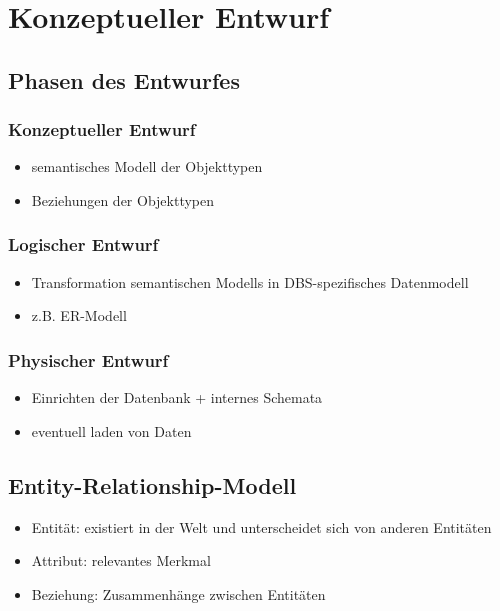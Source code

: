 \documentclass[a4paper]{article}
\begin{document}
\section{Konzeptueller Entwurf}

\subsection{Phasen des Entwurfes}
\subsubsection{Konzeptueller Entwurf}
\begin{itemize}
    \item semantisches Modell der Objekttypen
    \item Beziehungen der Objekttypen
\end{itemize}

\subsubsection{Logischer Entwurf}
\begin{itemize}
    \item Transformation semantischen Modells in DBS-spezifisches Datenmodell
    \item z.B. ER-Modell
\end{itemize}

\subsubsection{Physischer Entwurf}
\begin{itemize}
    \item Einrichten der Datenbank + internes Schemata
    \item eventuell laden von Daten
\end{itemize}

\subsection{Entity-Relationship-Modell}
\begin{itemize}
    \item Entität: existiert in der Welt und unterscheidet sich von anderen Entitäten
    \item Attribut: relevantes Merkmal
    \item Beziehung: Zusammenhänge zwischen Entitäten
\end{itemize}
\end{document}
